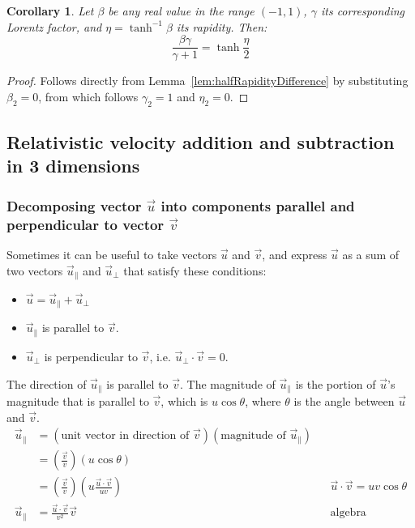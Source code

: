 \documentclass[a4paper]{article}
\theoremstyle{plain}
\newtheorem{corollary}[theorem]{Corollary}
\theoremstyle{definition}
\newcommand{\vect}[1]{\vec{#1}}
\begin{document}
\begin{corollary}
Let $\beta$ be any real value in the range $(-1,1)$, $\gamma$ its
corresponding Lorentz factor, and $\eta = \tanh^{-1} \beta$ its
rapidity.
Then:
\begin{equation}
\frac{\beta \gamma}{\gamma + 1} = \tanh \frac{\eta}{2}
\end{equation}
\end{corollary}

\begin{proof}
Follows directly from Lemma~\ref{lem:halfRapidityDifference} by
substituting $\beta_2 =0$, from which follows $\gamma_2 = 1$ and
$\eta_2=0$.
\end{proof}


\subsection{Relativistic velocity addition and subtraction in 3 dimensions}
\label{app:3drelvelocityaddsub}


\subsubsection{Decomposing vector $\vect{u}$ into components parallel and perpendicular to vector $\vect{v}$}
\label{app:decomposeVectorIntoParallelPlusPerpendicular}

Sometimes it can be useful to take vectors $\vect{u}$ and $\vect{v}$,
and express $\vect{u}$ as a sum of two vectors $\vect{u}_{\parallel}$
and $\vect{u}_{\perp}$ that satisfy these conditions:
\begin{itemize}
\item $\vect{u} = \vect{u}_{\parallel} + \vect{u}_{\perp}$
\item $\vect{u}_{\parallel}$ is parallel to $\vect{v}$.
\item $\vect{u}_{\perp}$ is perpendicular to $\vect{v}$,
  i.e. $\vect{u}_{\perp} \cdot \vect{v} = 0$.
\end{itemize}

The direction of $\vect{u}_{\parallel}$ is parallel to $\vect{v}$.
The magnitude of $\vect{u}_{\parallel}$ is the portion of $\vect{u}$'s
magnitude that is parallel to $\vect{v}$, which is $u \cos \theta$,
where $\theta$ is the angle between $\vect{u}$ and $\vect{v}$.
\begin{align}
\vect{u}_{\parallel}
  & = (\text{unit vector in direction of $\vect{v}$})(\text{magnitude of $\vect{u}_{\parallel}$}) \nonumber \\
  & = (\frac{\vect{v}}{v}) (u \cos \theta) \nonumber \\
  & = (\frac{\vect{v}}{v}) (u \frac{\vect{u} \cdot \vect{v}}{uv}) & & \text{$\vect{u} \cdot \vect{v} = uv \cos \theta$} \nonumber \\
\vect{u}_{\parallel}
  & = \frac{\vect{u} \cdot \vect{v}}{v^2} \vect{v} & & \text{algebra} \label{eqn:uParallel}
\end{align}
\end{document}
